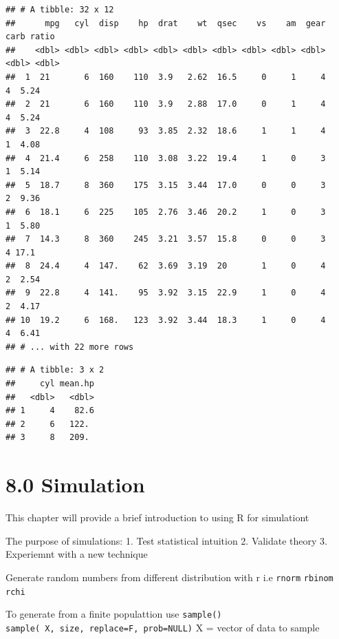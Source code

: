 \documentclass[]{article}
\newenvironment{Shaded}{\begin{snugshade}}{\end{snugshade}}
\newcommand{\KeywordTok}[1]{\textcolor[rgb]{0.13,0.29,0.53}{\textbf{#1}}}
\newcommand{\DataTypeTok}[1]{\textcolor[rgb]{0.13,0.29,0.53}{#1}}
\newcommand{\StringTok}[1]{\textcolor[rgb]{0.31,0.60,0.02}{#1}}
\newcommand{\OperatorTok}[1]{\textcolor[rgb]{0.81,0.36,0.00}{\textbf{#1}}}
\newcommand{\NormalTok}[1]{#1}
\begin{document}
\begin{verbatim}
## # A tibble: 32 x 12
##      mpg   cyl  disp    hp  drat    wt  qsec    vs    am  gear  carb ratio
##    <dbl> <dbl> <dbl> <dbl> <dbl> <dbl> <dbl> <dbl> <dbl> <dbl> <dbl> <dbl>
##  1  21       6  160    110  3.9   2.62  16.5     0     1     4     4  5.24
##  2  21       6  160    110  3.9   2.88  17.0     0     1     4     4  5.24
##  3  22.8     4  108     93  3.85  2.32  18.6     1     1     4     1  4.08
##  4  21.4     6  258    110  3.08  3.22  19.4     1     0     3     1  5.14
##  5  18.7     8  360    175  3.15  3.44  17.0     0     0     3     2  9.36
##  6  18.1     6  225    105  2.76  3.46  20.2     1     0     3     1  5.80
##  7  14.3     8  360    245  3.21  3.57  15.8     0     0     3     4 17.1 
##  8  24.4     4  147.    62  3.69  3.19  20       1     0     4     2  2.54
##  9  22.8     4  141.    95  3.92  3.15  22.9     1     0     4     2  4.17
## 10  19.2     6  168.   123  3.92  3.44  18.3     1     0     4     4  6.41
## # ... with 22 more rows
\end{verbatim}

\begin{Shaded}
\end{Shaded}

\begin{verbatim}
## # A tibble: 3 x 2
##     cyl mean.hp
##   <dbl>   <dbl>
## 1     4    82.6
## 2     6   122. 
## 3     8   209.
\end{verbatim}

\section{8.0 Simulation}\label{simulation}

This chapter will provide a brief introduction to using R for
simulationt

The purpose of simulations: 1. Test statistical intuition 2. Validate
theory 3. Experiemnt with a new technique

Generate random numbers from different distribution with r i.e
\texttt{rnorm} \texttt{rbinom} \texttt{rchi}

To generate from a finite populattion use \texttt{sample()}
\texttt{sample(\ X,\ size,\ replace=F,\ prob=NULL)} X = vector of data
to sample
\end{document}
